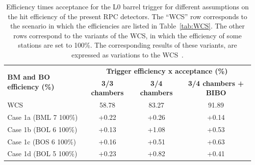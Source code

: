 \begin{table}[h]
	\begin{center}
		\small
		\begin{tabular}{l|c|c|c}
			\hline
			\multirow{2}{*}{\textbf{BM and BO efficiency (\%)}} & \multicolumn{3}{c}{\textbf{Trigger efficiency x acceptance (\%)}}\\
			\cline{2-4}   
			& \textbf{3/3 chambers} & \textbf{3/4 chambers} & \textbf{3/4 chambers + BIBO}\\
			\hline 
			WCS 												& 58.78 				& 83.27 		& 91.89\\
			Case 1a (BML 7 100\%) 								& +0.22                 & +0.26 		& +0.14\\
			Case 1b (BOL 6 100\%) 								& +0.13 				& +1.08 		& +0.53\\
			Case 1c (BOS 6 100\%) 								& +0.16 				& +0.51 		& +0.63\\
			Case 1d (BOL 5 100\%) 								& +0.23 				& +0.82 		& +0.41\\		
			\hline 
		\end{tabular} 
		\caption{Efficiency times acceptance for the L0 barrel trigger for different assumptions on the hit efficiency of the present RPC detectors. The “WCS” row corresponds to the scenario in which the efficiencies are listed in Table~\ref{tab:WCS}. The other rows correspond to the variants of the WCS, in which the efficiency of some stations are set to 100\%. The corresponding results of these variants, are expressed as variations to the WCS~\cite{Marcoccia:2693982}.} 
		\label{tab:allcasesBMBO}
	\end{center} 
\end{table} 

